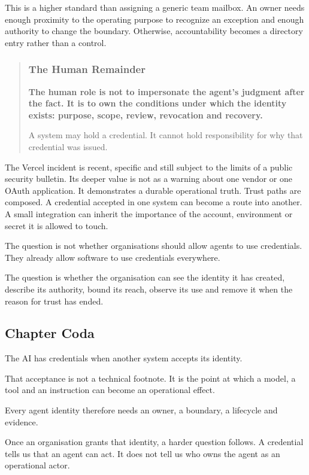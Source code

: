 This is a higher standard than assigning a generic team mailbox. An
owner needs enough proximity to the operating purpose to recognize an
exception and enough authority to change the boundary. Otherwise,
accountability becomes a directory entry rather than a control.

\begin{quote}
\subsubsection{The Human Remainder}\label{the-human-remainder}

\textbf{The human role is not to impersonate the agent's judgment after
the fact. It is to own the conditions under which the identity exists:
purpose, scope, review, revocation and recovery.}

A system may hold a credential. It cannot hold responsibility for why
that credential was issued.
\end{quote}

The Vercel incident is recent, specific and still subject to the limits
of a public security bulletin. Its deeper value is not as a warning
about one vendor or one OAuth application. It demonstrates a durable
operational truth. Trust paths are composed. A credential accepted in
one system can become a route into another. A small integration can
inherit the importance of the account, environment or secret it is
allowed to touch.

The question is not whether organisations should allow agents to use
credentials. They already allow software to use credentials everywhere.

The question is whether the organisation can see the identity it has
created, describe its authority, bound its reach, observe its use and
remove it when the reason for trust has ended.

\subsection{Chapter Coda}\label{chapter-coda}

The AI has credentials when another system accepts its identity.

That acceptance is not a technical footnote. It is the point at which a
model, a tool and an instruction can become an operational effect.

Every agent identity therefore needs an owner, a boundary, a lifecycle
and evidence.

Once an organisation grants that identity, a harder question follows. A
credential tells us that an agent can act. It does not tell us who owns
the agent as an operational actor.
